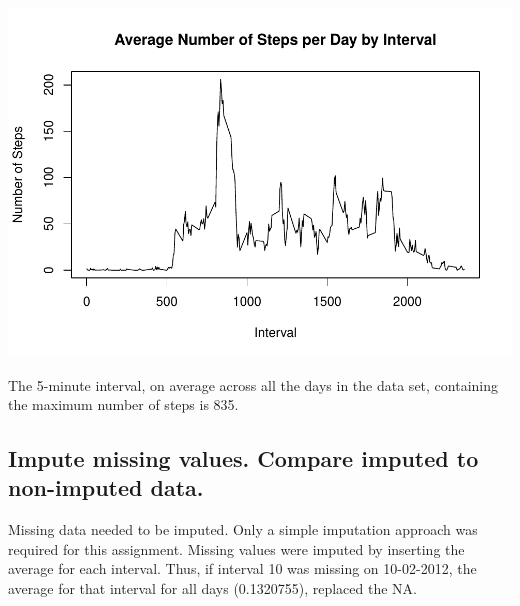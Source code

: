 \documentclass[]{article}
\newenvironment{Shaded}{\begin{snugshade}}{\end{snugshade}}
\newcommand{\KeywordTok}[1]{\textcolor[rgb]{0.13,0.29,0.53}{\textbf{#1}}}
\newcommand{\DataTypeTok}[1]{\textcolor[rgb]{0.13,0.29,0.53}{#1}}
\newcommand{\DecValTok}[1]{\textcolor[rgb]{0.00,0.00,0.81}{#1}}
\newcommand{\StringTok}[1]{\textcolor[rgb]{0.31,0.60,0.02}{#1}}
\newcommand{\OperatorTok}[1]{\textcolor[rgb]{0.81,0.36,0.00}{\textbf{#1}}}
\newcommand{\NormalTok}[1]{#1}
\begin{document}
\includegraphics{PA1_template_files/figure-latex/unnamed-chunk-3-1.pdf}

\begin{Shaded}
\end{Shaded}

The 5-minute interval, on average across all the days in the data set,
containing the maximum number of steps is 835.

\subsection{Impute missing values. Compare imputed to non-imputed
data.}\label{impute-missing-values.-compare-imputed-to-non-imputed-data.}

Missing data needed to be imputed. Only a simple imputation approach was
required for this assignment. Missing values were imputed by inserting
the average for each interval. Thus, if interval 10 was missing on
10-02-2012, the average for that interval for all days (0.1320755),
replaced the NA.

\begin{Shaded}
\end{Shaded}
\end{document}
